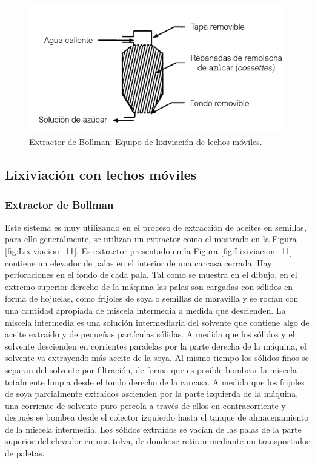 \documentclass[11pt]{book}
\begin{document}
\begin{figure}[H]
    \centering
    \includegraphics{img/lixiviacion/EquipoLixiviacion_2.PNG}
    \caption{Extractor de Bollman: Equipo de lixiviación de lechos móviles.}
    \label{fig:Lixiviacion_10}
\end{figure}

\subsection{Lixiviación con lechos móviles}

\subsubsection{Extractor de Bollman}

Este sistema es muy utilizando en el proceso de extracción de aceites en semillas, para ello generalmente, se utilizan un extractor como el mostrado en la Figura \ref{fig:Lixiviacion_11}. Es extractor presentado en la Figura \ref{fig:Lixiviacion_11} contiene un elevador de palas en el interior de una carcasa cerrada. Hay perforaciones en el fondo de cada pala. Tal como se muestra en el dibujo, en el extremo superior derecho de la máquina las palas son cargadas con sólidos en forma de hojuelas, como frijoles de soya o semillas de maravilla y se rocían con una cantidad apropiada de miscela intermedia a medida que descienden. La miscela intermedia es una solución intermediaria del solvente que contiene algo de aceite extraído y de pequeñas partículas sólidas. A medida que los sólidos y el solvente descienden en corrientes paralelas por la parte derecha de la máquina, el solvente va extrayendo más aceite de la soya. Al mismo tiempo los sólidos finos se separan del solvente por filtración, de forma que es posible bombear la miscela totalmente limpia desde el fondo derecho de la carcasa. A medida que los frijoles de soya parcialmente extraídos ascienden por la parte izquierda de la máquina, una corriente de solvente puro percola a través de ellos en contracorriente y después se bombea desde el colector izquierdo hasta el tanque de almacenamiento de la miscela intermedia. Los sólidos extraídos se vacían de las palas de la parte superior del elevador en una tolva, de donde se retiran mediante un transportador de paletas. 
\end{document}
